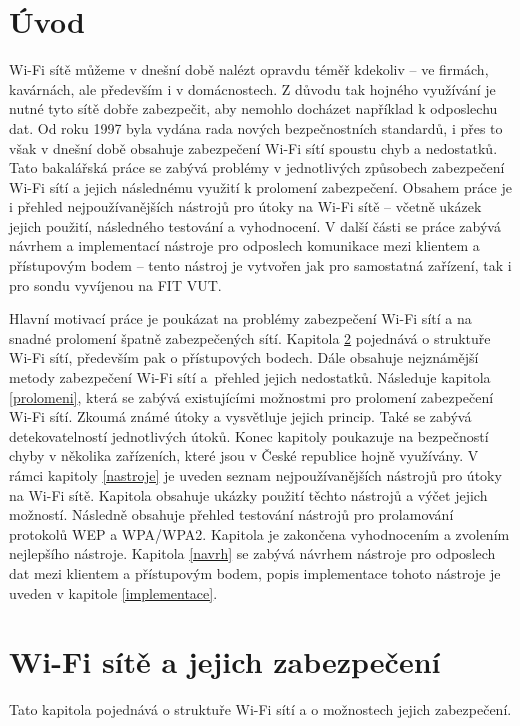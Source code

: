 \chapter{Úvod}
Wi-Fi sítě můžeme v dnešní době nalézt opravdu téměř kdekoliv -- ve firmách, kavárnách, ale především i v domácnostech. Z důvodu tak hojného využívání je nutné tyto sítě dobře zabezpečit, aby nemohlo docházet například k odposlechu dat. Od roku 1997 byla vydána rada nových bezpečnostních standardů, i přes to však v dnešní době obsahuje zabezpečení Wi-Fi sítí spoustu chyb a nedostatků. Tato bakalářská práce se zabývá problémy v jednotlivých způsobech zabezpečení Wi-Fi sítí a jejich následnému využití k prolomení zabezpečení. Obsahem práce je i přehled nejpoužívanějších nástrojů pro útoky na Wi-Fi sítě -- včetně ukázek jejich použití, následného testování a vyhodnocení. V další části se práce zabývá návrhem a implementací nástroje pro odposlech komunikace mezi klientem a přístupovým bodem -- tento nástroj je vytvořen jak pro samostatná zařízení, tak i pro sondu vyvíjenou na FIT VUT. 

Hlavní motivací práce je poukázat na problémy zabezpečení Wi-Fi sítí a na snadné prolomení špatně zabezpečených sítí. Kapitola \ref{zabezpeceni} pojednává o struktuře Wi-Fi sítí, především pak o přístupových bodech. Dále obsahuje nejznámější metody zabezpečení Wi-Fi sítí a~přehled jejich nedostatků. Následuje kapitola \ref{prolomeni}, která se zabývá existujícími možnostmi pro prolomení zabezpečení Wi-Fi sítí. Zkoumá známé útoky a vysvětluje jejich princip. Také se zabývá detekovatelností jednotlivých útoků. Konec kapitoly poukazuje na bezpečností chyby v několika zařízeních, které jsou v České republice hojně využívány. V rámci kapitoly \ref{nastroje} je uveden seznam nejpoužívanějších nástrojů pro útoky na Wi-Fi sítě. Kapitola obsahuje ukázky použití těchto nástrojů a výčet jejich možností. Následně obsahuje přehled testování nástrojů pro prolamování protokolů WEP a WPA/WPA2. Kapitola je zakončena vyhodnocením a zvolením nejlepšího nástroje. Kapitola \ref{navrh} se zabývá návrhem nástroje pro odposlech dat mezi klientem a přístupovým bodem, popis implementace tohoto nástroje je uveden v kapitole \ref{implementace}.

\chapter{Wi-Fi sítě a jejich zabezpečení} 
\label{zabezpeceni}

Tato kapitola pojednává o struktuře Wi-Fi sítí a o možnostech jejich zabezpečení. 

